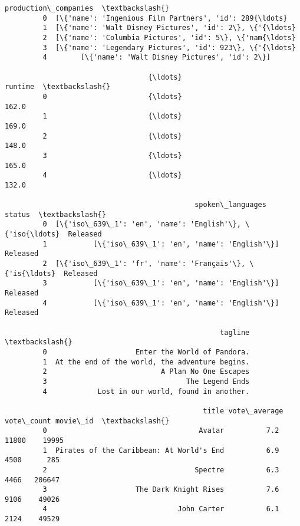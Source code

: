 \documentclass[11pt]{article}
\begin{document}
\begin{Verbatim}[commandchars=\\\{\}]
                                         production\_companies  \textbackslash{}
         0  [\{'name': 'Ingenious Film Partners', 'id': 289{\ldots}   
         1  [\{'name': 'Walt Disney Pictures', 'id': 2\}, \{'{\ldots}   
         2  [\{'name': 'Columbia Pictures', 'id': 5\}, \{'nam{\ldots}   
         3  [\{'name': 'Legendary Pictures', 'id': 923\}, \{'{\ldots}   
         4        [\{'name': 'Walt Disney Pictures', 'id': 2\}]   
         
                                  {\ldots}                         runtime  \textbackslash{}
         0                        {\ldots}                           162.0   
         1                        {\ldots}                           169.0   
         2                        {\ldots}                           148.0   
         3                        {\ldots}                           165.0   
         4                        {\ldots}                           132.0   
         
                                             spoken\_languages    status  \textbackslash{}
         0  [\{'iso\_639\_1': 'en', 'name': 'English'\}, \{'iso{\ldots}  Released   
         1           [\{'iso\_639\_1': 'en', 'name': 'English'\}]  Released   
         2  [\{'iso\_639\_1': 'fr', 'name': 'Français'\}, \{'is{\ldots}  Released   
         3           [\{'iso\_639\_1': 'en', 'name': 'English'\}]  Released   
         4           [\{'iso\_639\_1': 'en', 'name': 'English'\}]  Released   
         
                                                   tagline  \textbackslash{}
         0                     Enter the World of Pandora.   
         1  At the end of the world, the adventure begins.   
         2                           A Plan No One Escapes   
         3                                 The Legend Ends   
         4            Lost in our world, found in another.   
         
                                               title vote\_average vote\_count movie\_id  \textbackslash{}
         0                                    Avatar          7.2      11800    19995   
         1  Pirates of the Caribbean: At World's End          6.9       4500      285   
         2                                   Spectre          6.3       4466   206647   
         3                     The Dark Knight Rises          7.6       9106    49026   
         4                               John Carter          6.1       2124    49529   
         

\end{Verbatim}
\end{document}
